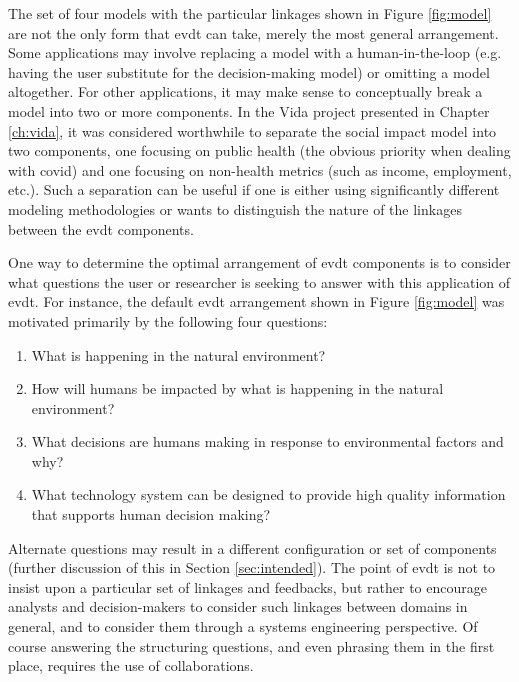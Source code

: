 The set of four models with the particular linkages shown in Figure \ref{fig:model} are not the only form that \ac{evdt} can take, merely the most general arrangement. Some applications may involve replacing a model with a human-in-the-loop (e.g. having the user substitute for the decision-making model) or omitting a model altogether. For other applications, it may make sense to conceptually break a model into two or more components. In the Vida project presented in Chapter \ref{ch:vida}, it was considered worthwhile to separate the social impact model into two components, one focusing on public health (the obvious priority when dealing with \ac{covid}) and one focusing on non-health metrics (such as income, employment, etc.). Such a separation can be useful if one is either using significantly different modeling methodologies or wants to distinguish the nature of the linkages between the \ac{evdt} components. 

One way to determine the optimal arrangement of \ac{evdt} components is to consider what questions the user or researcher is seeking to answer with this application of \ac{evdt}. For instance, the default \ac{evdt} arrangement shown in Figure \ref{fig:model} was motivated primarily by the following four questions:

\begin{enumerate} \setlength{\itemsep}{0pt} \setlength{\parskip}{0pt}
    \item What is happening in the natural environment?
    \item How will humans be impacted by what is happening in the natural environment?
    \item What decisions are humans making in response to environmental factors and why?
    \item What technology system can be designed to provide high quality information that supports human decision making?
\end{enumerate}

Alternate questions may result in a different configuration or set of components (further discussion of this in Section \ref{sec:intended}). The point of \ac{evdt} is not to insist upon a particular set of linkages and feedbacks, but rather to encourage analysts and decision-makers to consider such linkages between domains in general, and to consider them through a systems engineering perspective. Of course answering the structuring questions, and even phrasing them in the first place, requires the use of collaborations.


